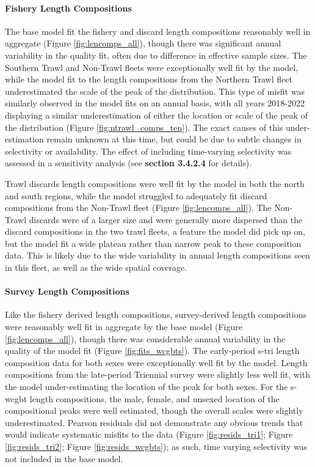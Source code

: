 \documentclass[11pt,
  english,
  letterpaper,
]{article}
\begin{document}
\hypertarget{fishery-length-compositions-1}{%
\paragraph{Fishery Length Compositions}\label{fishery-length-compositions-1}}

The base model fit the fishery and discard length compositions reasonably well in aggregate (Figure \ref{fig:lencomps_all}), though there was significant annual variability in the quality fit, often due to difference in effective sample sizes. The Southern Trawl and Non-Trawl fleets were exceptionally well fit by the model, while the model fit to the length compositions from the Northern Trawl fleet underestimated the scale of the peak of the distribution. This type of misfit was similarly observed in the model fits on an annual basis, with all years 2018-2022 displaying a similar underestimation of either the location or scale of the peak of the distribution (Figure \ref{fig:ntrawl_comps_ten}). The exact causes of this under-estimation remain unknown at this time, but could be due to subtle changes in selectivity or availability. The effect of including time-varying selectivity was assessed in a sensitivity analysis (see \textbf{section 3.4.2.4} for details).

Trawl discards length compositions were well fit by the model in both the north and south regions, while the model struggled to adequately fit discard compositions from the Non-Trawl fleet (Figure \ref{fig:lencomps_all}). The Non-Trawl discards were of a larger size and were generally more dispersed than the discard compositions in the two trawl fleets, a feature the model did pick up on, but the model fit a wide plateau rather than narrow peak to these composition data. This is likely due to the wide variability in annual length compositions seen in this fleet, as well as the wide spatial coverage.

\hypertarget{survey-length-compositions}{%
\paragraph{Survey Length Compositions}\label{survey-length-compositions}}

Like the fishery derived length compositions, survey-derived length compositions were reasonably well fit in aggregate by the base model (Figure \ref{fig:lencomps_all}), though there was considerable annual variability in the quality of the model fit (Figure \ref{fig:fits_wcgbts}). The early-period \gls{s-tri} length composition data for both sexes were exceptionally well fit by the model. Length compositions from the late-period Triennial survey were slightly less well fit, with the model under-estimating the location of the peak for both sexes. For the \gls{s-wcgbt} length compositions, the male, female, and unsexed location of the compositional peaks were well estimated, though the overall scales were slightly underestimated. Pearson residuals did not demonstrate any obvious trends that would indicate systematic misfits to the data (Figure \ref{fig:resids_tri1}; Figure \ref{fig:resids_tri2}; Figure \ref{fig:resids_wcgbts}); as such, time varying selectivity was not included in the base model.
\end{document}
